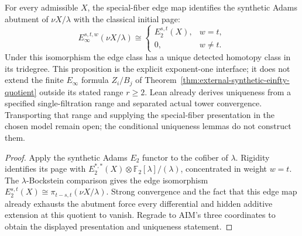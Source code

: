 \begin{proposition}
  \label{prop:synthetic-einfty-first-quotient}
  \notready
  For every admissible $X$, the special-fiber edge map identifies the
  synthetic Adams abutment of $\nu X/\lambda$ with the classical initial page:
  \[
    E_\infty^{s,t,w}(\nu X/\lambda)\cong
    \begin{cases}
      E_2^{s,t}(X),&w=t,\\
      0,&w\ne t.
    \end{cases}
  \]
  Under this isomorphism the edge class has a unique detected homotopy class
  in its tridegree.  This proposition is the explicit exponent-one interface;
  it does not extend the finite $E_\infty$ formula $Z_i/B_j$ of
  Theorem~\ref{thm:external-synthetic-einfty-quotient} outside its stated
  range $r\ge2$.
  Lean already derives uniqueness from a specified single-filtration
  range and separated actual tower convergence. Transporting that range
  and supplying the special-fiber presentation in the chosen model
  remain open; the conditional uniqueness lemmas do not construct them.
\end{proposition}

\begin{proof}
  Apply the synthetic Adams $E_2$ functor to the cofiber of $\lambda$.
  Rigidity identifies its page with
  $E_2^{*,*}(X)\otimes\mathbb F_2[\lambda]/(\lambda)$, concentrated in weight
  $w=t$.  The $\lambda$-Bockstein comparison gives the edge isomorphism
  $E_2^{s,t}(X)\cong\pi_{t-s,t}(\nu X/\lambda)$.  Strong convergence and the
  fact that this edge map already exhausts the abutment force every
  differential and hidden additive extension at this quotient to vanish.
  Regrade to AIM's three coordinates to obtain the displayed presentation and
  uniqueness statement.
\end{proof}


